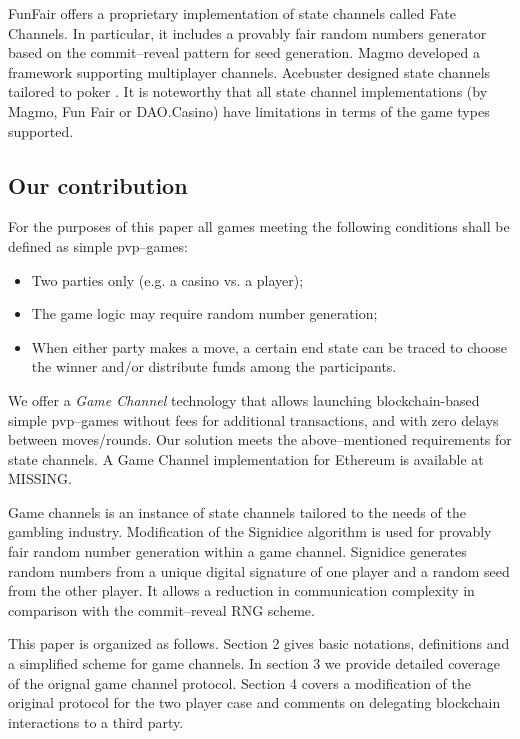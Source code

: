 	FunFair \cite{bib15} offers a proprietary implementation of state channels called Fate Channels. In particular, it includes a provably fair random numbers generator based on the commit--reveal pattern for seed generation. Magmo \cite{bib16} developed a framework supporting multiplayer channels. Acebuster designed state channels tailored to poker \cite{bib17}. It is noteworthy that all state channel implementations (by Magmo, Fun Fair or DAO.Casino) have limitations in terms of the game types supported.

		\subsection {Our contribution}
	For the purposes of this paper all games meeting the following conditions shall be defined as simple pvp--games:
	\begin{itemize}
		\item Two parties only (e.g. a casino vs. a player);
		\item The game logic may require random number generation;
		\item When either party makes a move, a certain end state can be traced to choose the winner and/or distribute funds among the participants.
	\end{itemize}
	We offer a \textit {Game Channel} technology that allows launching blockchain-based simple pvp--games without fees for additional transactions, and with zero delays between moves/rounds. Our solution meets the above--mentioned requirements for state channels. A Game Channel implementation for Ethereum is available at MISSING.

	Game channels is an instance of state channels tailored to the needs of the gambling industry. Modification of the Signidice \cite{bib18} algorithm is used for provably fair random number generation within a game channel. Signidice generates random numbers from a unique digital signature of one player and a random seed from the other player. It allows a reduction in communication complexity in comparison with the commit--reveal RNG scheme. 

This paper is organized as follows. Section 2 gives basic notations, definitions and a simplified scheme for game channels. In section 3 we provide detailed coverage of the orignal game channel protocol. Section 4 covers a modification of the original protocol for the two player case and comments on delegating blockchain interactions to a third party.